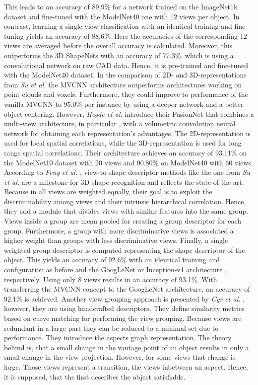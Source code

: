 This leads to an accuracy of 89.9\% for a network trained on the ImageNet1k dataset and fine-tuned with the ModelNet40 one with 12 views per object.
In contrast, learning a single-view classification with an identical training and fine-tuning yields an accuracy of 88.6\%.
Here the accuracies of the corresponding 12 views are averaged before the overall accuracy is calculated.
Moreover, this outperforms the 3D ShapeNets \cite{conf/cvpr/WuSKYZTX15} with an accuracy of 77.3\%, which is using a convolutional network on raw CAD data.
Hence, it is pre-trained and fine-tuned with the ModelNet40 dataset.
In the comparison of 2D- and 3D-representations from \textit{Su et al.} \cite{Su2018} the MVCNN architecture outperforms architectures working on point clouds and voxels.
Furthermore, they could improve to performance of the vanilla MVCNN to 95.0\% per instance by using a deeper network and a better object centering.
However, \textit{Hegde et al.} introduce their FusionNet \cite{Hegde2016FusionNet3O} that combines a multi-view architecture, in particular \cite{Su:2015:MCN:2919332.2919750}, with a volumetric convolution neural network for obtaining each representation's advantages.
The 2D-representation is used for local spatial correlations, while the 3D-representation is used for long range spatial correlations.
Their architecture achieves an accuracy of 93.11\% on the ModelNet10 dataset with 20 views and 90.80\% on ModelNet40 with 60 views.
According to \textit{Feng et al.} \cite{Feng2018}, view-to-shape descriptor methods like the one from \textit{Su et al.} are a milestone for 3D shape recognition and reflects the state-of-the-art.
Because in \cite{Su:2015:MCN:2919332.2919750} all views are weighted equally, their goal is to exploit the discriminability among views and their intrinsic hierarchical correlation.
Hence, they add a module that divides views with similar features into the same group.
Views inside a group are mean pooled for creating a group descriptor for each group.
Furthermore, a group with more discriminative views is associated a higher weight than groups with less discriminative views.
Finally, a single weighted group descriptor is computed representing the shape descriptor of the object.
This yields an accuracy of 92.6\% with an identical training and configuration as before and the GoogLeNet or Inception-v1 architecture \cite{szegedy2015going}, respectively.
Using only 8 views results in an accuracy of 93.1\%.
With transferring the MVCNN concept to the GoogLeNet architecture, an accuracy of 92.1\% is achieved.
Another view grouping approach is presented by \textit{Cyr et al.} \cite{Cyr2004}, however, they are using handcrafted descriptors.
They define similarity metrics based on curve matching for performing the view grouping.
Because views are redundant in a large part they can be reduced to a minimal set due to performance.
They introduce the aspects graph representation.
The theory behind is, that a small change in the vantage point of an object results in only a small change in the view projection.
However, for some views that change is large.
Those views represent a transition, the views inbetween an aspect.
Hence, it is supposed, that the first describes the object satisfiable.